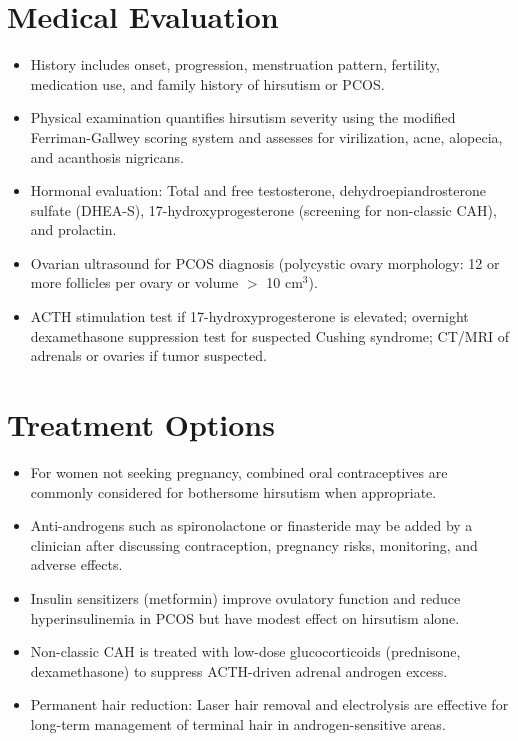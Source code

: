 \section*{Medical Evaluation}
\begin{itemize}
  \item History includes onset, progression, menstruation pattern, fertility, medication use, and family history of hirsutism or PCOS.
  \item Physical examination quantifies hirsutism severity using the modified Ferriman-Gallwey scoring system and assesses for virilization, acne, alopecia, and acanthosis nigricans.
  \item Hormonal evaluation: Total and free testosterone, dehydroepiandrosterone sulfate (DHEA-S), 17-hydroxyprogesterone (screening for non-classic CAH), and prolactin.
  \item Ovarian ultrasound for PCOS diagnosis (polycystic ovary morphology: 12 or more follicles per ovary or volume $>$ 10 cm$^3$).
  \item ACTH stimulation test if 17-hydroxyprogesterone is elevated; overnight dexamethasone suppression test for suspected Cushing syndrome; CT/MRI of adrenals or ovaries if tumor suspected.
\end{itemize}

\section*{Treatment Options}
\begin{itemize}
  \item For women not seeking pregnancy, combined oral contraceptives are commonly considered for bothersome hirsutism when appropriate.
  \item Anti-androgens such as spironolactone or finasteride may be added by a clinician after discussing contraception, pregnancy risks, monitoring, and adverse effects.
  \item Insulin sensitizers (metformin) improve ovulatory function and reduce hyperinsulinemia in PCOS but have modest effect on hirsutism alone.
  \item Non-classic CAH is treated with low-dose glucocorticoids (prednisone, dexamethasone) to suppress ACTH-driven adrenal androgen excess.
  \item Permanent hair reduction: Laser hair removal and electrolysis are effective for long-term management of terminal hair in androgen-sensitive areas.
\end{itemize}

